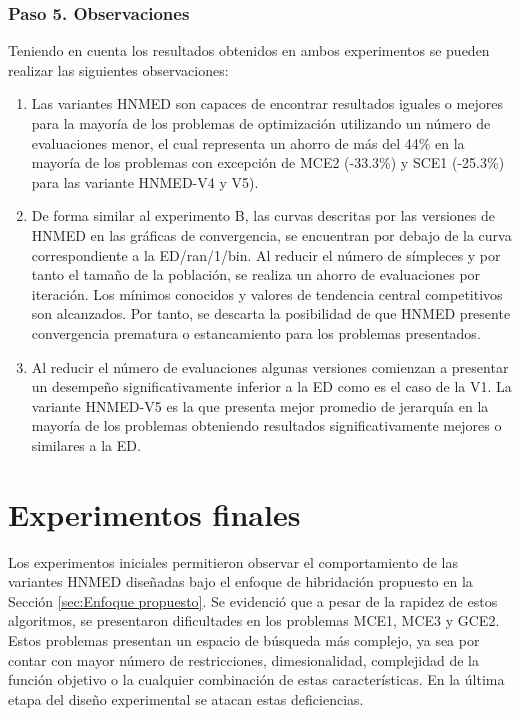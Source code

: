 \subsubsection{Paso 5. Observaciones}
Teniendo en cuenta los resultados obtenidos en ambos experimentos se pueden realizar las siguientes observaciones:
\begin{enumerate}
	\item Las variantes HNMED son capaces de encontrar resultados iguales o mejores para la mayoría de los problemas de optimización utilizando un número de evaluaciones menor, el cual representa un ahorro de más del 44\% en la mayoría de los problemas con excepción de MCE2 (-33.3\%) y SCE1 (-25.3\%) para las variante HNMED-V4 y V5).      
	\item De forma similar al experimento B, las curvas descritas por las versiones de HNMED en las gráficas de convergencia, se encuentran por debajo de la curva correspondiente a la ED/ran/1/bin. Al reducir el número de símpleces y por tanto el tamaño de la población, se realiza un ahorro de evaluaciones por iteración. Los mínimos conocidos y valores de tendencia central competitivos son alcanzados. Por tanto, se descarta la posibilidad de que HNMED presente convergencia prematura o estancamiento para los problemas presentados. 
	\item Al reducir el número de evaluaciones algunas versiones comienzan a presentar un desempeño significativamente inferior a la ED como es el caso de la V1. La variante HNMED-V5 es la que presenta mejor promedio de jerarquía en la mayoría de los problemas obteniendo resultados significativamente mejores o similares a la ED.
\end{enumerate}




\section{Experimentos finales}
Los experimentos iniciales permitieron observar el comportamiento de las variantes HNMED diseñadas bajo el enfoque de hibridación propuesto en la Sección \ref{sec:Enfoque propuesto}. Se evidenció que a pesar de la rapidez de estos algoritmos, se presentaron dificultades en los problemas MCE1, MCE3 y GCE2. Estos problemas presentan un espacio de búsqueda más complejo, ya sea por contar con mayor número de restricciones, dimesionalidad, complejidad de la función objetivo o la cualquier combinación de estas características. En la última etapa del diseño experimental se atacan estas deficiencias.



